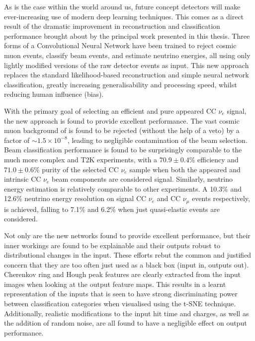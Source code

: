 As is the case within the world around us, future \chips concept detectors will make
ever-increasing use of modern deep learning techniques. This comes as a direct result of the
dramatic improvement in \chipsfive reconstruction and classification performance brought about by
the principal work presented in this thesis. Three forms of a Convolutional Neural Network have
been trained to reject cosmic muon events, classify beam events, and estimate neutrino energies,
all using only lightly modified versions of the raw detector events as input. This new approach
replaces the standard likelihood-based reconstruction and simple neural network classification,
greatly increasing generalisability and processing speed, whilst reducing human influence (bias).

With the primary goal of selecting an efficient and pure appeared CC $\nu_{e}$ signal, the new
approach is found to provide excellent performance. The vast cosmic muon background of \chipsfive
is found to be rejected (without the help of a veto) by a factor of $\sim1.5\times10^{-8}$,
leading to negligible contamination of the beam selection. Beam classification performance is
found to be surprisingly comparable to the much more complex \nova and T2K experiments, with a
$70.9\pm0.4\%$ efficiency and $71.0\pm0.6\%$ purity of the selected CC $\nu_{e}$ sample when both
the appeared and intrinsic CC $\nu_{e}$ beam components are considered signal. Similarly, neutrino
energy estimation is relatively comparable to other experiments. A 10.3\% and 12.6\% neutrino
energy resolution on signal CC $\nu_{e}$ and CC $\nu_{\mu}$ events respectively, is achieved,
falling to 7.1\% and 6.2\% when just quasi-elastic events are considered. 

Not only are the new networks found to provide excellent performance, but their inner workings are
found to be explainable and their outputs robust to distributional changes in the input. These
efforts rebut the common and justified concern that they are too often just used as a black box
(input in, outputs out). Cherenkov ring and Hough peak features are clearly extracted from the
input images when looking at the output feature maps. This results in a learnt representation of
the inputs that is seen to have strong discriminating power between classification categories when
visualised using the t-SNE technique. Additionally, realistic modifications to the input hit time
and charges, as well as the addition of random noise, are all found to have a negligible effect on
output performance.

